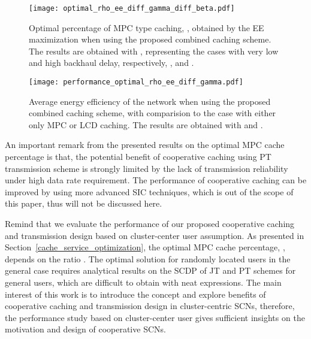 \documentclass[twocolumns,10pt]{IEEEtran}
\begin{document}
\begin{figure}
	\centering
	\texttt{[image: optimal\_rho\_ee\_diff\_gamma\_diff\_beta.pdf]}
	\caption{Optimal percentage of MPC type caching, , obtained by the EE maximization when using the proposed combined caching scheme. The results are obtained with , representing the cases with very low and high backhaul delay, respectively, , and .}
	\label{optimal_rho_ee_diff_beta}
\end{figure}



\begin{figure}
	\centering
	\texttt{[image: performance\_optimal\_rho\_ee\_diff\_gamma.pdf]}
	\caption{Average energy efficiency of the network when using the proposed combined caching scheme, with comparision to the case with either only MPC or LCD caching. The results are obtained with  and .}
	\label{performance_optimal_rho}
\end{figure}

An important remark from the presented results on the optimal MPC cache percentage is that, the potential benefit of cooperative caching using PT transmission scheme is strongly limited by the lack of transmission reliability under high data rate requirement. The performance of cooperative caching can be improved by using more advanced SIC techniques, which is out of the scope of this paper, thus will not be discussed here. 

Remind that we evaluate the performance of our proposed cooperative caching and transmission design based on cluster-center user assumption. As presented in Section~\ref{cache_service_optimization}, the optimal MPC cache percentage, , depends on the ratio . The optimal solution for randomly located users in the general case requires analytical results on the SCDP of JT and PT schemes for general users, which are difficult to obtain with neat expressions. The main interest of this work is to introduce the concept and explore benefits of cooperative caching and transmission design in cluster-centric SCNs, therefore, the performance study based on cluster-center user gives sufficient insights on the motivation and design of cooperative SCNs.    
\end{document}
